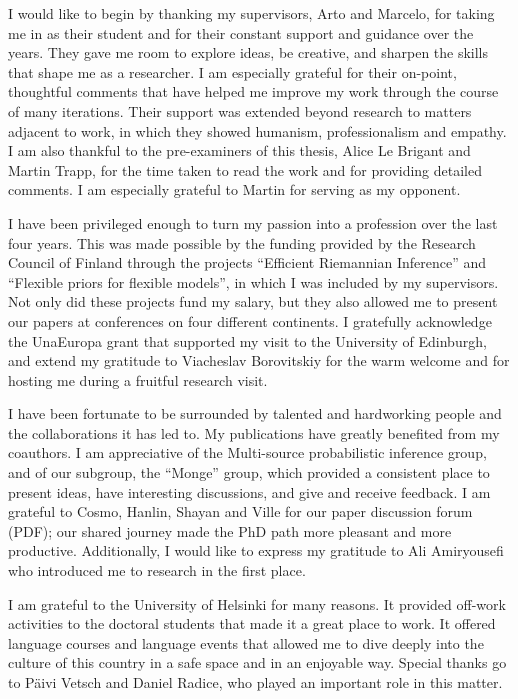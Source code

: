 \begin{acknowledgements}

I would like to begin by thanking my supervisors, Arto and Marcelo, for taking me in as their student and for their constant support and guidance over the years.
They gave me room to explore ideas, be creative, and sharpen the skills that shape me as a researcher. I am especially grateful for their on-point, thoughtful comments that have helped me improve my work through the course of many iterations.
Their support was extended beyond research to matters adjacent to work, in which they showed humanism, professionalism and empathy.
I am also thankful to the pre-examiners of this thesis, Alice Le Brigant and Martin Trapp, for the time taken to read the work and for providing detailed comments. I am especially grateful to Martin for serving as my opponent. 

I have been privileged enough to turn my passion into a profession over the last four years. This was made possible by the funding provided by the Research Council of Finland through the projects ``Efficient Riemannian Inference'' and ``Flexible priors for flexible models'', in which I was included by my supervisors. 
Not only did these projects fund my salary, but they also allowed me to present our papers at conferences on four different continents. 
I gratefully acknowledge the UnaEuropa grant that supported my visit to the University of Edinburgh, and extend my gratitude to Viacheslav Borovitskiy for the warm welcome and for hosting me during a fruitful research visit. 

I have been fortunate to be surrounded by talented and hardworking people and the collaborations it has led to. My publications have greatly benefited from my coauthors. 
I am appreciative of the  Multi-source probabilistic inference group, and of our subgroup, the ``Monge'' group, which provided a consistent place to present ideas, have interesting discussions, and give and receive feedback. 
I am grateful to Cosmo, Hanlin, Shayan and Ville for our paper discussion forum (PDF); our shared journey made the PhD path more pleasant and more productive.
Additionally, I would like to express my gratitude to Ali Amiryousefi who introduced me to research in the first place.

I am grateful to the University of Helsinki for many reasons.
It provided off-work activities to the doctoral students that made it a great place to work.
It offered language courses and language events that allowed me to dive deeply into the culture of this country in a safe space and in an enjoyable way.
Special thanks go to P\"aivi Vetsch and Daniel Radice, who played an important role in this matter.



\end{acknowledgements}
